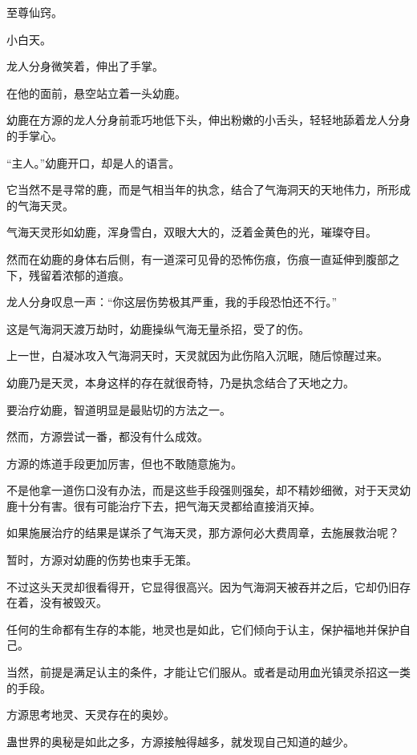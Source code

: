 
\begin{this_body}

至尊仙窍。

小白天。

龙人分身微笑着，伸出了手掌。

在他的面前，悬空站立着一头幼鹿。

幼鹿在方源的龙人分身前乖巧地低下头，伸出粉嫩的小舌头，轻轻地舔着龙人分身的手掌心。

“主人。”幼鹿开口，却是人的语言。

它当然不是寻常的鹿，而是气相当年的执念，结合了气海洞天的天地伟力，所形成的气海天灵。

气海天灵形如幼鹿，浑身雪白，双眼大大的，泛着金黄色的光，璀璨夺目。

然而在幼鹿的身体右后侧，有一道深可见骨的恐怖伤痕，伤痕一直延伸到腹部之下，残留着浓郁的道痕。

龙人分身叹息一声：“你这层伤势极其严重，我的手段恐怕还不行。”

这是气海洞天渡万劫时，幼鹿操纵气海无量杀招，受了的伤。

上一世，白凝冰攻入气海洞天时，天灵就因为此伤陷入沉眠，随后惊醒过来。

幼鹿乃是天灵，本身这样的存在就很奇特，乃是执念结合了天地之力。

要治疗幼鹿，智道明显是最贴切的方法之一。

然而，方源尝试一番，都没有什么成效。

方源的炼道手段更加厉害，但也不敢随意施为。

不是他拿一道伤口没有办法，而是这些手段强则强矣，却不精妙细微，对于天灵幼鹿十分有害。很有可能治疗下去，把气海天灵都给直接消灭掉。

如果施展治疗的结果是谋杀了气海天灵，那方源何必大费周章，去施展救治呢？

暂时，方源对幼鹿的伤势也束手无策。

不过这头天灵却很看得开，它显得很高兴。因为气海洞天被吞并之后，它却仍旧存在着，没有被毁灭。

任何的生命都有生存的本能，地灵也是如此，它们倾向于认主，保护福地并保护自己。

当然，前提是满足认主的条件，才能让它们服从。或者是动用血光镇灵杀招这一类的手段。

方源思考地灵、天灵存在的奥妙。

蛊世界的奥秘是如此之多，方源接触得越多，就发现自己知道的越少。


\end{this_body}
